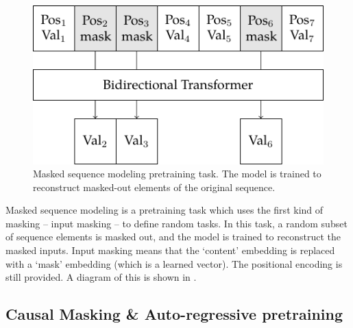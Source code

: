 \begin{figure}
    \centering
    \includegraphics{figures/pretraining-msm.pdf}
    \caption[Masked Sequence Modeling Pretraining]{Masked sequence modeling pretraining task. The model is trained to reconstruct masked-out elements of the original sequence.}
    \hrulefill
    \label{fig:pretraining-msm}
\end{figure}

Masked sequence modeling is a pretraining task which uses the first kind of masking -- input masking -- to define random tasks. In this task, a random subset of sequence elements is masked out, and the model is trained to reconstruct the masked inputs. Input masking means that the `content' embedding is replaced with a `mask' embedding (which is a learned vector). The positional encoding is still provided. A diagram of this is shown in .

\subsection{Causal Masking \& Auto-regressive pretraining}
\label{ss:autoreg-pretraining}

